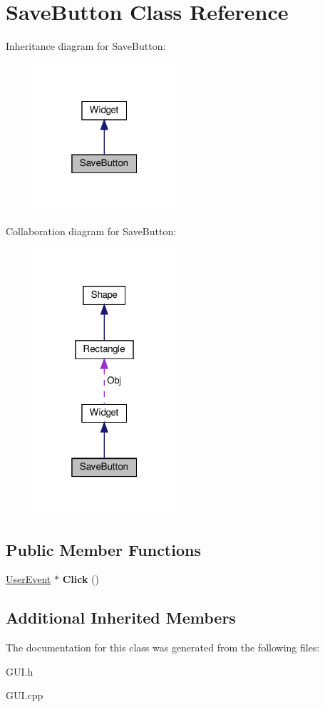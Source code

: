 \hypertarget{classSaveButton}{}\section{Save\+Button Class Reference}
\label{classSaveButton}


Inheritance diagram for Save\+Button\+:\nopagebreak
\begin{figure}[H]
\begin{center}
\leavevmode
\includegraphics[width=148pt]{classSaveButton__inherit__graph}
\end{center}
\end{figure}


Collaboration diagram for Save\+Button\+:\nopagebreak
\begin{figure}[H]
\begin{center}
\leavevmode
\includegraphics[width=148pt]{classSaveButton__coll__graph}
\end{center}
\end{figure}
\subsection*{Public Member Functions}
\begin{DoxyCompactItemize}
\item 
\mbox{\label{classSaveButton_af5a177a907bced69df780571328ee073}} 
\hyperlink{classUserEvent}{User\+Event} $\ast$ {\bfseries Click} ()
\end{DoxyCompactItemize}
\subsection*{Additional Inherited Members}


The documentation for this class was generated from the following files\+:\begin{DoxyCompactItemize}
\item 
G\+U\+I.\+h\item 
G\+U\+I.\+cpp\end{DoxyCompactItemize}
